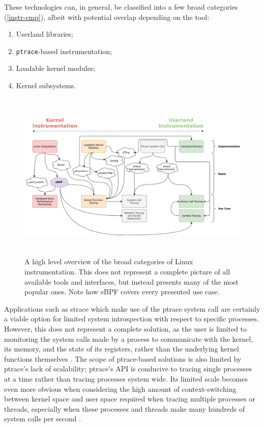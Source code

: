 \documentclass[
  12pt]{findlay}
\newcommand{\passthrough}[1]{#1}
\providecommand{\tightlist}{\setlength{\itemsep}{0pt}\setlength{\parskip}{0pt}}
\begin{document}
These technologies can, in general, be classified into a few broad
categories (\autoref{instr-cmp}), albeit with potential overlap
depending on the tool:

\begin{enumerate}
\def\labelenumi{\arabic{enumi})}
\tightlist
\item
  Userland libraries;
\item
  \passthrough{\lstinline!ptrace!}-based instrumentation;
\item
  Loadable kernel modules;
\item
  Kernel subsystems.
\end{enumerate}

\begin{figure}[p]
\begin{center}
\includegraphics[keepaspectratio, height=3.2in]{../figures/instr-cmp.png}
\end{center}
\caption[A high level overview of the broad categories of Linux instrumentation]{
A high level overview of the broad categories of Linux instrumentation.
This does not represent a complete picture of all available tools and interfaces,
but instead presents many of the most popular ones. Note how eBPF covers every presented use case.
}
\label{instr-cmp}
\end{figure}

\FloatBarrier

Applications such as strace \autocite{strace,manstrace} which make use
of the ptrace system call are certainly a viable option for limited
system introspection with respect to specific processes. However, this
does not represent a complete solution, as the user is limited to
monitoring the system calls made by a process to communicate with the
kernel, its memory, and the state of its registers, rather than the
underlying kernel functions themselves \autocite{manptrace}. The scope
of ptrace-based solutions is also limited by ptrace's lack of
scalability; ptrace's API is conducive to tracing single processes at a
time rather than tracing processes system wide. Its limited scale
becomes even more obvious when considering the high amount of
context-switching between kernel space and user space required when
tracing multiple processes or threads, especially when these processes
and threads make many hundreds of system calls per second
\autocite{keniston07}.
\end{document}
